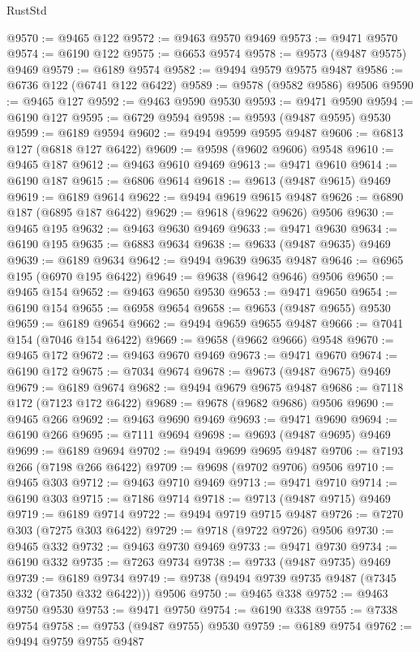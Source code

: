 \begin{lexlean}{RustStd}
\begin{coremodule}
@9570 := @9465 @122
@9572 := @9463 @9570 @9469
@9573 := @9471 @9570
@9574 := @6190 @122
@9575 := @6653 @9574
@9578 := @9573 (@9487 @9575) @9469
@9579 := @6189 @9574
@9582 := @9494 @9579 @9575 @9487
@9586 := @6736 @122 (@6741 @122 @6422)
@9589 := @9578 (@9582 @9586) @9506
@9590 := @9465 @127
@9592 := @9463 @9590 @9530
@9593 := @9471 @9590
@9594 := @6190 @127
@9595 := @6729 @9594
@9598 := @9593 (@9487 @9595) @9530
@9599 := @6189 @9594
@9602 := @9494 @9599 @9595 @9487
@9606 := @6813 @127 (@6818 @127 @6422)
@9609 := @9598 (@9602 @9606) @9548
@9610 := @9465 @187
@9612 := @9463 @9610 @9469
@9613 := @9471 @9610
@9614 := @6190 @187
@9615 := @6806 @9614
@9618 := @9613 (@9487 @9615) @9469
@9619 := @6189 @9614
@9622 := @9494 @9619 @9615 @9487
@9626 := @6890 @187 (@6895 @187 @6422)
@9629 := @9618 (@9622 @9626) @9506
@9630 := @9465 @195
@9632 := @9463 @9630 @9469
@9633 := @9471 @9630
@9634 := @6190 @195
@9635 := @6883 @9634
@9638 := @9633 (@9487 @9635) @9469
@9639 := @6189 @9634
@9642 := @9494 @9639 @9635 @9487
@9646 := @6965 @195 (@6970 @195 @6422)
@9649 := @9638 (@9642 @9646) @9506
@9650 := @9465 @154
@9652 := @9463 @9650 @9530
@9653 := @9471 @9650
@9654 := @6190 @154
@9655 := @6958 @9654
@9658 := @9653 (@9487 @9655) @9530
@9659 := @6189 @9654
@9662 := @9494 @9659 @9655 @9487
@9666 := @7041 @154 (@7046 @154 @6422)
@9669 := @9658 (@9662 @9666) @9548
@9670 := @9465 @172
@9672 := @9463 @9670 @9469
@9673 := @9471 @9670
@9674 := @6190 @172
@9675 := @7034 @9674
@9678 := @9673 (@9487 @9675) @9469
@9679 := @6189 @9674
@9682 := @9494 @9679 @9675 @9487
@9686 := @7118 @172 (@7123 @172 @6422)
@9689 := @9678 (@9682 @9686) @9506
@9690 := @9465 @266
@9692 := @9463 @9690 @9469
@9693 := @9471 @9690
@9694 := @6190 @266
@9695 := @7111 @9694
@9698 := @9693 (@9487 @9695) @9469
@9699 := @6189 @9694
@9702 := @9494 @9699 @9695 @9487
@9706 := @7193 @266 (@7198 @266 @6422)
@9709 := @9698 (@9702 @9706) @9506
@9710 := @9465 @303
@9712 := @9463 @9710 @9469
@9713 := @9471 @9710
@9714 := @6190 @303
@9715 := @7186 @9714
@9718 := @9713 (@9487 @9715) @9469
@9719 := @6189 @9714
@9722 := @9494 @9719 @9715 @9487
@9726 := @7270 @303 (@7275 @303 @6422)
@9729 := @9718 (@9722 @9726) @9506
@9730 := @9465 @332
@9732 := @9463 @9730 @9469
@9733 := @9471 @9730
@9734 := @6190 @332
@9735 := @7263 @9734
@9738 := @9733 (@9487 @9735) @9469
@9739 := @6189 @9734
@9749 := @9738 (@9494 @9739 @9735 @9487 (@7345 @332 (@7350 @332 @6422))) @9506
@9750 := @9465 @338
@9752 := @9463 @9750 @9530
@9753 := @9471 @9750
@9754 := @6190 @338
@9755 := @7338 @9754
@9758 := @9753 (@9487 @9755) @9530
@9759 := @6189 @9754
@9762 := @9494 @9759 @9755 @9487

\end{coremodule}
\end{lexlean}
